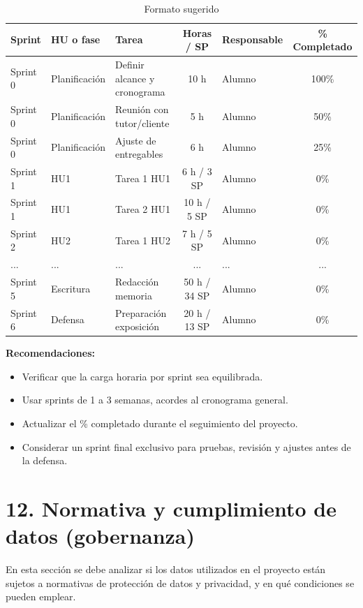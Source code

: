 \documentclass[
11pt, %
]{ProyectoVpC}
\begin{document}
\begin{table}[htpb]
\centering
\caption{Formato sugerido}
\begin{tabularx}{\linewidth}{@{}|l|l|X|c|l|c|@{}}
\hline
\rowcolor[HTML]{C0C0C0}
Sprint & HU o fase & Tarea & Horas / SP & Responsable & \% Completado \\ \hline
Sprint 0 & Planificación & Definir alcance y cronograma & 10 h & Alumno & 100\% \\ \hline
Sprint 0 & Planificación & Reunión con tutor/cliente & 5 h & Alumno & 50\% \\ \hline
Sprint 0 & Planificación & Ajuste de entregables & 6 h & Alumno & 25\% \\ \hline
Sprint 1 & HU1 & Tarea 1 HU1 & 6 h / 3 SP & Alumno & 0\% \\ \hline
Sprint 1 & HU1 & Tarea 2 HU1 & 10 h / 5 SP & Alumno & 0\% \\ \hline
Sprint 2 & HU2 & Tarea 1 HU2 & 7 h / 5 SP & Alumno & 0\% \\ \hline
... & ... & ... & ... & ... & ... \\ \hline
Sprint 5 & Escritura & Redacción memoria & 50 h / 34 SP & Alumno & 0\% \\ \hline
Sprint 6 & Defensa & Preparación exposición & 20 h / 13 SP & Alumno & 0\% \\ \hline
\end{tabularx}
\end{table}

\textbf{Recomendaciones:}
\begin{itemize}
  \item Verificar que la carga horaria por sprint sea equilibrada.
  \item Usar sprints de 1 a 3 semanas, acordes al cronograma general.
  \item Actualizar el \% completado durante el seguimiento del proyecto.
  \item Considerar un sprint final exclusivo para pruebas, revisión y ajustes antes de la defensa.
\end{itemize}


\section{12. Normativa y cumplimiento de datos (gobernanza)}

En esta sección se debe analizar si los datos utilizados en el proyecto están sujetos a normativas de protección de datos y privacidad, y en qué condiciones se pueden emplear.
\end{document}
